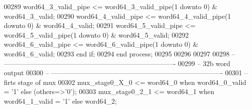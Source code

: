 \begin{DoxyCode}
00289       \textcolor{vhdlchar}{word64_3_valid_pipe} \textcolor{vhdlchar}{<=} \textcolor{vhdlchar}{word64_3_valid_pipe}\textcolor{vhdlchar}{(}\textcolor{vhdllogic}{}\textcolor{vhdllogic}{1} \textcolor{keywordflow}{downto} \textcolor{vhdllogic}{}\textcolor{vhdllogic}{0}\textcolor{vhdlchar}{)} \textcolor{vhdlchar}{&} \textcolor{vhdlchar}{word64_3_valid};
00290       \textcolor{vhdlchar}{word64_4_valid_pipe} \textcolor{vhdlchar}{<=} \textcolor{vhdlchar}{word64_4_valid_pipe}\textcolor{vhdlchar}{(}\textcolor{vhdllogic}{}\textcolor{vhdllogic}{1} \textcolor{keywordflow}{downto} \textcolor{vhdllogic}{}\textcolor{vhdllogic}{0}\textcolor{vhdlchar}{)} \textcolor{vhdlchar}{&} \textcolor{vhdlchar}{word64_4_valid};
00291       \textcolor{vhdlchar}{word64_5_valid_pipe} \textcolor{vhdlchar}{<=} \textcolor{vhdlchar}{word64_5_valid_pipe}\textcolor{vhdlchar}{(}\textcolor{vhdllogic}{}\textcolor{vhdllogic}{1} \textcolor{keywordflow}{downto} \textcolor{vhdllogic}{}\textcolor{vhdllogic}{0}\textcolor{vhdlchar}{)} \textcolor{vhdlchar}{&} \textcolor{vhdlchar}{word64_5_valid};
00292       \textcolor{vhdlchar}{word64_6_valid_pipe} \textcolor{vhdlchar}{<=} \textcolor{vhdlchar}{word64_6_valid_pipe}\textcolor{vhdlchar}{(}\textcolor{vhdllogic}{}\textcolor{vhdllogic}{1} \textcolor{keywordflow}{downto} \textcolor{vhdllogic}{}\textcolor{vhdllogic}{0}\textcolor{vhdlchar}{)} \textcolor{vhdlchar}{&} \textcolor{vhdlchar}{word64_6_valid};
00293    \textcolor{keywordflow}{end} \textcolor{keywordflow}{if};
00294 \textcolor{keywordflow}{end} \textcolor{keywordflow}{process};   
00295 
00296  
00297 
00298 \textcolor{keyword}{-- ----------------------------------------------------------------------------}
00299 \textcolor{keyword}{-- 32b word output}
00300 \textcolor{keyword}{-- ----------------------------------------------------------------------------}
00301 \textcolor{keyword}{--firts stage of mux}
00302 \textcolor{vhdlchar}{mux_stage0_X_0} \textcolor{vhdlchar}{<=} \textcolor{vhdlchar}{word64_0} \textcolor{keywordflow}{when} \textcolor{vhdlchar}{word64_0_valid} \textcolor{vhdlchar}{=} \textcolor{vhdlchar}{'}\textcolor{vhdllogic}{}\textcolor{vhdllogic}{1}\textcolor{vhdlchar}{'} \textcolor{keywordflow}{else} \textcolor{vhdlchar}{(}\textcolor{keywordflow}{others}\textcolor{vhdlchar}{=}\textcolor{vhdlchar}{>}\textcolor{vhdlchar}{'}\textcolor{vhdllogic}{}\textcolor{vhdllogic}{0}\textcolor{vhdlchar}{'}\textcolor{vhdlchar}{)};
00303 \textcolor{vhdlchar}{mux_stage0_2_1} \textcolor{vhdlchar}{<=} \textcolor{vhdlchar}{word64_1} \textcolor{keywordflow}{when} \textcolor{vhdlchar}{word64_1_valid} \textcolor{vhdlchar}{=} \textcolor{vhdlchar}{'}\textcolor{vhdllogic}{}\textcolor{vhdllogic}{1}\textcolor{vhdlchar}{'} \textcolor{keywordflow}{else} \textcolor{vhdlchar}{word64_2};

\end{DoxyCode}

